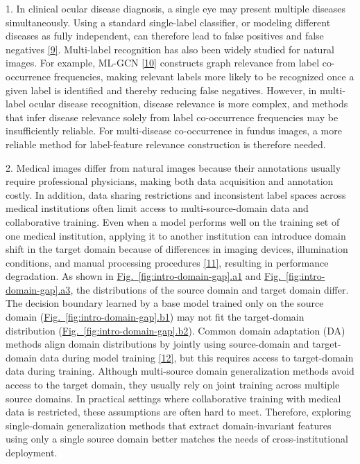 1. In clinical ocular disease diagnosis, a single eye may present multiple diseases simultaneously. Using a standard single-label classifier, or modeling different diseases as fully independent, can therefore lead to false positives and false negatives \hyperref[_Ref213949362]{{[}9{]}}. Multi-label recognition has also been widely studied for natural images. For example, ML-GCN \hyperref[_Ref213949382]{{[}10{]}} constructs graph relevance from label co-occurrence frequencies, making relevant labels more likely to be recognized once a given label is identified and thereby reducing false negatives. However, in multi-label ocular disease recognition, disease relevance is more complex, and methods that infer disease relevance solely from label co-occurrence frequencies may be insufficiently reliable. For multi-disease co-occurrence in fundus images, a more reliable method for label-feature relevance construction is therefore needed.

2. Medical images differ from natural images because their annotations usually require professional physicians, making both data acquisition and annotation costly. In addition, data sharing restrictions and inconsistent label spaces across medical institutions often limit access to multi-source-domain data and collaborative training. Even when a model performs well on the training set of one medical institution, applying it to another institution can introduce domain shift in the target domain because of differences in imaging devices, illumination conditions, and manual processing procedures \hyperref[_Ref213949348]{{[}11{]}}, resulting in performance degradation. As shown in \hyperref[fig:intro-domain-gap]{Fig.~\ref*{fig:intro-domain-gap}.a1} and \hyperref[fig:intro-domain-gap]{Fig.~\ref*{fig:intro-domain-gap}.a3}, the distributions of the source domain and target domain differ. The decision boundary learned by a base model trained only on the source domain (\hyperref[fig:intro-domain-gap]{Fig.~\ref*{fig:intro-domain-gap}.b1}) may not fit the target-domain distribution (\hyperref[fig:intro-domain-gap]{Fig.~\ref*{fig:intro-domain-gap}.b2}). Common domain adaptation (DA) methods align domain distributions by jointly using source-domain and target-domain data during model training \hyperref[_Ref213949354]{{[}12{]}}, but this requires access to target-domain data during training. Although multi-source domain generalization methods avoid access to the target domain, they usually rely on joint training across multiple source domains. In practical settings where collaborative training with medical data is restricted, these assumptions are often hard to meet. Therefore, exploring single-domain generalization methods that extract domain-invariant features using only a single source domain better matches the needs of cross-institutional deployment.

